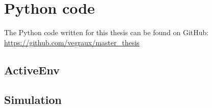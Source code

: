 \documentclass[11pt]{book}
\begin{document}
\chapter{Python code}
The Python code written for this thesis can be found on GitHub: \url{https://github.com/vegraux/master_thesis}
\section{ActiveEnv}



\section{Simulation}

\end{document}
